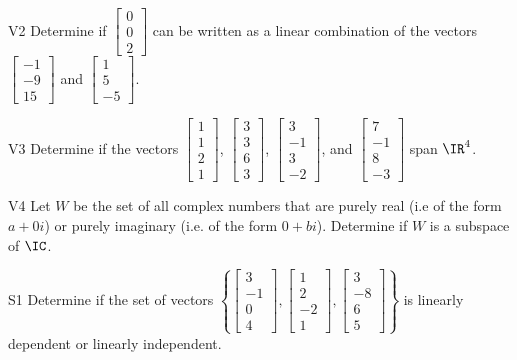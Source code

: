 \documentclass{sbgLAexam}
\begin{document}
\begin{problem}{V2}
Determine if  $\begin{bmatrix} 0 \\ 0 \\ 2 \end{bmatrix}$ can be written as a linear combination of the vectors $\begin{bmatrix} -1 \\ -9 \\ 15 \end{bmatrix}$ and $\begin{bmatrix} 1 \\ 5 \\ -5 \end{bmatrix}$.
\end{problem}

\begin{problem}{V3}
Determine if the vectors $\begin{bmatrix} 1 \\ 1 \\ 2 \\1 \end{bmatrix}$, $\begin{bmatrix} 3 \\ 3 \\ 6 \\ 3 \end{bmatrix}$, $\begin{bmatrix}3 \\ -1 \\ 3 \\ -2\end{bmatrix}$, and $\begin{bmatrix} 7 \\ -1 \\ 8 \\ -3 \end{bmatrix}$  span $\IR^4$.
\end{problem}

\begin{problem}{V4} Let \(W\) be the set of all complex numbers
that are purely real (i.e of the form $a+0i$)  or purely imaginary (i.e. of the form $0+bi$).
Determine if \(W\) is a subspace of \(\IC\).
\end{problem}

\begin{problem}{S1}
Determine if the set of vectors $\left\{\begin{bmatrix} 3 \\ -1 \\ 0 \\ 4 \end{bmatrix}, \begin{bmatrix} 1  \\ 2 \\ -2 \\ 1 \end{bmatrix}, \begin{bmatrix} 3 \\ -8 \\ 6 \\ 5 \end{bmatrix} \right\}$  is linearly dependent or linearly independent.
\end{problem}
\end{document}
